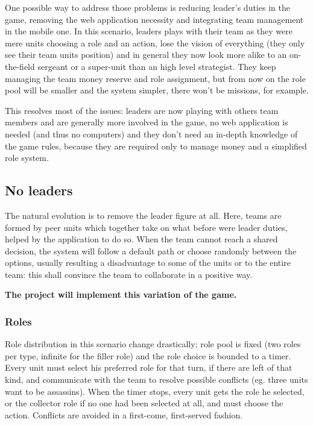 			One possible way to address those problems is reducing leader's duties in the game, removing the web application necessity and integrating team management in the mobile one.
			In this scenario, leaders plays with their team as they were mere units choosing a role and an action, lose the vision of everything (they only see their team units position) and in general they now look more alike to an on-the-field sergeant or a super-unit than an high level strategist.
			They keep managing the team money reserve and role assignment, but from now on the role pool will be smaller and the system simpler, there won't be missions, for example.
			
			This resolves most of the issues: leaders are now playing with others team members and are generally more involved in the game, no web application is needed (and thus no computers) and they don't need an in-depth knowledge of the game rules, because they are required only to manage money and a simplified role system.
		
		\subsection{No leaders}
		
			The natural evolution is to remove the leader figure at all.
			Here, teams are formed by peer units which together take on what before were leader duties, helped by the application to do so.
			When the team cannot reach a shared decision, the system will follow a default path or choose randomly between the options, usually resulting a disadvantage to some of the units or to the entire team: this shall convince the team to collaborate in a positive way.
			
			\textbf{The project will implement this variation of the game.}
			
			\subsubsection{Roles}
			\label{nolead:role}
				Role distribution in this scenario change drastically: role pool is fixed (two roles per type, infinite for the filler role) and the role choice is bounded to a timer.
				Every unit must select his preferred role for that turn, if there are left of that kind, and communicate with the team to resolve possible conflicts (eg. three units want to be assassins).
				When the timer stops, every unit gets the role he selected, or the collector role if no one had been selected at all, and must choose the action. Conflicts are avoided in a first-come, first-served fashion.
				
